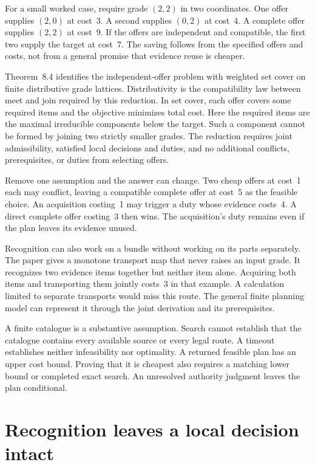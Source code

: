 \documentclass{momentum}
\begin{document}
For a small worked case, require grade $(2,2)$ in two coordinates. One offer supplies $(2,0)$ at cost~3. A second supplies $(0,2)$ at cost~4. A complete offer supplies $(2,2)$ at cost~9. If the offers are independent and compatible, the first two supply the target at cost~7. The saving follows from the specified offers and costs, not from a general promise that evidence reuse is cheaper.

Theorem~8.4 identifies the independent-offer problem with weighted set cover on finite distributive grade lattices. Distributivity is the compatibility law between meet and join required by this reduction. In set cover, each offer covers some required items and the objective minimizes total cost. Here the required items are the maximal irreducible components below the target. Such a component cannot be formed by joining two strictly smaller grades. The reduction requires joint admissibility, satisfied local decisions and duties, and no additional conflicts, prerequisites, or duties from selecting offers. \cite[Section~8, Theorem~8.4 and Example~8.5]{composes}

Remove one assumption and the answer can change. Two cheap offers at cost~1 each may conflict, leaving a compatible complete offer at cost~5 as the feasible choice. An acquisition costing~1 may trigger a duty whose evidence costs~4. A direct complete offer costing~3 then wins. The acquisition's duty remains even if the plan leaves its evidence unused. \cite[Section~8, Example~8.5]{composes}

Recognition can also work on a bundle without working on its parts separately. The paper gives a monotone transport map that never raises an input grade. It recognizes two evidence items together but neither item alone. Acquiring both items and transporting them jointly costs~3 in that example. A calculation limited to separate transports would miss this route. The general finite planning model can represent it through the joint derivation and its prerequisites.

A finite catalogue is a substantive assumption. Search cannot establish that the catalogue contains every available source or every legal route. A timeout establishes neither infeasibility nor optimality. A returned feasible plan has an upper cost bound. Proving that it is cheapest also requires a matching lower bound or completed exact search. An unresolved authority judgment leaves the plan conditional. \cite[Section~8.1]{composes}

\section{Recognition leaves a local decision intact}
\end{document}
